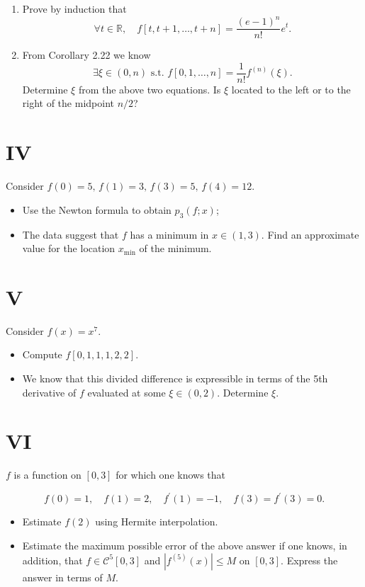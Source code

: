 \documentclass[a4paper]{article}
\begin{document}
\begin{enumerate}
    \item Prove by induction that
    \[
    \forall t \in \mathbb{R}, \quad f[t, t+1, \ldots, t+n] = \frac{(e-1)^{n}}{n!} e^{t}.
    \]
    \item From Corollary 2.22 we know
    \[
    \exists \xi \in (0, n) \text{ s.t. } f[0,1,\ldots, n] = \frac{1}{n!} f^{(n)}(\xi).
    \]
    Determine \( \xi \) from the above two equations. Is \( \xi \) located to the left or to the right of the midpoint \( n/2 \)?
\end{enumerate}



\section*{IV}
Consider $f(0)=5,\, f(1)=3,\, f(3)=5,\, f(4)=12$.

\begin{itemize}
    \item Use the Newton formula to obtain $p_{3}(f;x)$;
    \item The data suggest that $f$ has a minimum in $x\in(1,3)$. Find an approximate value for the location $x_{\text{min}}$ of the minimum.
\end{itemize}

\section*{V}
Consider $f(x)=x^{7}$.

\begin{itemize}
    \item Compute $f[0,1,1,1,2,2]$.
    \item We know that this divided difference is expressible in terms of the 5th derivative of $f$ evaluated at some $\xi\in(0,2)$. Determine $\xi$.
\end{itemize}

\section*{VI}
$f$ is a function on $[0,3]$ for which one knows that

\[
f(0)=1,\quad f(1)=2,\quad f^{\prime}(1)=-1,\quad f(3)=f^{\prime}(3)=0.
\]

\begin{itemize}
    \item Estimate $f(2)$ using Hermite interpolation.
    \item Estimate the maximum possible error of the above answer if one knows, in addition, that $f\in\mathcal{C}^{5}[0,3]$ and $|f^{(5)}(x)|\leq M$ on $[0,3]$. Express the answer in terms of $M$.
\end{itemize}
\end{document}
